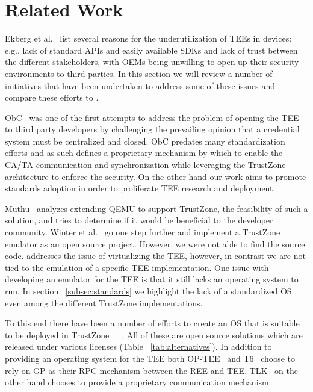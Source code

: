 \documentclass[10pt,conference,letterpaper]{IEEEtran}
\newcommand{\opentee}{\protect{TEE-Vi}\xspace}
\newcommand{\opentee}{\protect{Open-TEE}\xspace}
\begin{document}
\section{Related Work} 
\label{sec:relatedwork}



















Ekberg et al.~\cite{EkbergKA14} list several reasons for the underutilization of TEEs in devices: e.g., lack of standard APIs and easily available SDKs and lack of trust between the different stakeholders, with OEMs being unwilling to open up their security environments to third parties.  In this section we will review a number of initiatives that have been undertaken to address some of these issues and compare these efforts to \opentee.

ObC~\cite{KostiainenEAR09} was one of the first attempts to address the problem of opening the TEE to third party developers by challenging the prevailing opinion that a credential system must be centralized and closed. ObC predates many standardization efforts and as such defines a proprietary mechanism by which to enable the CA/TA communication and synchronization while leveraging the TrustZone architecture to enforce the security. On the other hand our work aims to promote standards adoption in order to proliferate TEE research and deployment.

Muthu~\cite{thesis:QEMU} analyzes extending QEMU to support TrustZone, the feasibility of such a solution, and tries to determine if it would be beneficial to the developer community. Winter et al.~\cite{WinterWPT11} go one step further and implement a TrustZone emulator as an open source project. However, we were not able to find the source code. \opentee addresses the issue of virtualizing the TEE, however, in contrast we are not tied to the emulation of a specific TEE implementation. One issue with developing an emulator for the TEE is that it still lacks an operating system to run. In section ~\ref{subsec:standards} we highlight the lack of a standardized OS even among the different TrustZone implementations.

To this end there have been a number of efforts to create an OS that is suitable to be deployed in TrustZone~\cite{web:NVIDIA_TLK}~\cite{web:linaro_op_tee}~\cite{web:T6}. All of these are open source solutions which are released under various licenses (Table ~\ref{tab:alternatives}). In addition to providing an operating system for the TEE both OP-TEE~\cite{web:linaro_op_tee} and T6~\cite{web:T6} choose to rely on GP as their RPC mechanism between the REE and TEE. TLK~\cite{web:NVIDIA_TLK} on the other hand chooses to provide a proprietary communication mechanism.
\end{document}
